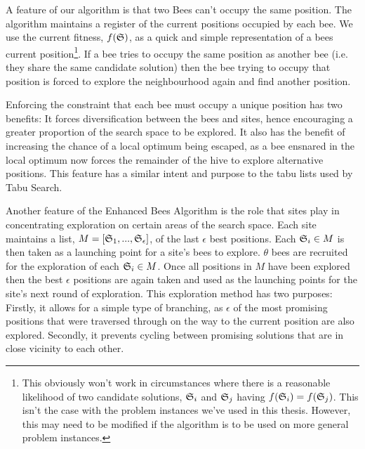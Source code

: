 
A feature of our algorithm is that two Bees can't occupy the same position. The algorithm maintains a register of the current positions occupied by each bee. We use the current fitness, $f(\mathfrak{S})$, as a quick and simple representation of a bees current position\footnote{This obviously won't work in circumstances where there is a reasonable likelihood of two candidate solutions, $\mathfrak{S}_i$ and $\mathfrak{S}_j$ having $f(\mathfrak{S}_i) = f(\mathfrak{S}_j)$. This isn't the case with the problem instances we've used in this thesis. However, this may need to be modified if the algorithm is to be used on more general problem instances.}. If a bee tries to occupy the same position as another bee (i.e. they share the same candidate solution) then the bee trying to occupy that position is forced to explore the neighbourhood again and find another position. 

Enforcing the constraint that each bee must occupy a unique position has two benefits: It forces diversification between the bees and sites, hence encouraging a greater proportion of the search space to be explored. It also has the benefit of increasing the chance of a local optimum being escaped, as a bee ensnared in the local optimum now forces the remainder of the hive to explore alternative positions. This feature has a similar intent and purpose to the tabu lists used by Tabu Search.

Another feature of the Enhanced Bees Algorithm is the role that sites play in concentrating exploration on certain areas of the search space. Each site maintains a list, $M = [\mathfrak{S}_1,..., \mathfrak{S}_\epsilon]$, of the last $\epsilon$ best positions. Each $\mathfrak{S}_i \in M$ is then taken as a launching point for a site's bees to explore. $\theta$ bees are recruited for the exploration of each $\mathfrak{S}_i \in M$. Once all positions in $M$ have been explored then the best $\epsilon$ positions are again taken and used as the launching points for the site's next round of exploration. This exploration method has two purposes: Firstly, it allows for a simple type of branching, as $\epsilon$ of the most promising positions that were traversed through on the way to the current position are also explored. Secondly, it prevents cycling between promising solutions that are in close vicinity to each other.

